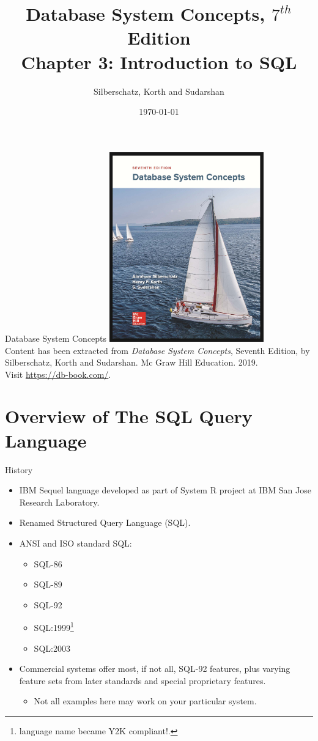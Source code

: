 \documentclass{beamer}
\title[Chapter 3]{Database System Concepts, $7^{th}$ Edition \\ Chapter 3: Introduction to SQL}
\author{Silberschatz, Korth and Sudarshan}
\date{\today}
\begin{document}
\frame{\titlepage}

\begin{frame}{Database System Concepts}
    \centering
    \includegraphics[width=0.5\textwidth]{figures/book_cover.jpg} \\
    \vspace{5mm}
    {
        \tiny
        Content has been extracted from \textit{Database System Concepts}, Seventh Edition, by Silberschatz, Korth and Sudarshan. Mc Graw Hill Education. 2019.\\
        Visit \url{https://db-book.com/}.\\
    }
\end{frame}

\section{Overview of The SQL Query Language}

\begin{frame}{History}
    \begin{itemize}
        \item IBM Sequel language developed as part of System R project at IBM San Jose Research Laboratory.
        \item Renamed Structured Query Language (SQL).
        \item ANSI and ISO standard SQL:
        \begin{itemize}
            \item SQL-86
            \item SQL-89
            \item SQL-92
            \item SQL:1999\footnote{language name became Y2K compliant!.}
            \item SQL:2003
        \end{itemize}
        \item Commercial systems offer most, if not all, SQL-92 features, plus varying feature sets from later standards and special proprietary features.
        \begin{itemize}
            \item Not all examples here may work on your particular system.
        \end{itemize}
    \end{itemize}
\end{frame}
\end{document}
